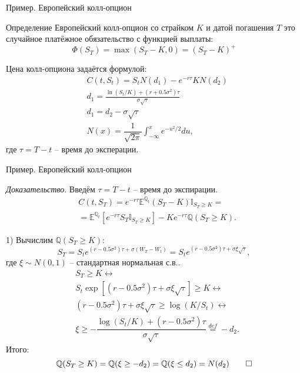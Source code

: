 \documentclass{beamer}
\begin{document}
\begin{frame}{Пример. Европейский колл-опцион}
    \begin{block}{Определение}
        Европейский колл-опцион со страйком $K$ и датой погашения $T$ это случайное платёжное обязательство с функцией выплаты:
        $$\Phi(S_T) = \max(S_T-K, 0) = (S_T - K)^+$$
    \end{block}

    \pause
    Цена колл-опциона задаётся формулой:
    \begin{align*}
        &C(t, S_t) = S_t N(d_1) - e^{-r\tau}K N(d_2) \\
        & d_1 = \frac{\ln(S_t/K) + (r+0.5\sigma^2)\tau}{\sigma \sqrt{\tau}}\\
        &d_1 = d_2 - \sigma \sqrt{\tau}\\
        & N(x) = \dfrac{1}{\sqrt{2\pi}}\int_{-\infty}^x e^{-u^2/2}du,
    \end{align*}где $\tau=T-t$ -- время до эксперации.
\end{frame}

\begin{frame}{Пример. Европейский колл-опцион}
    
    \textit{Доказательство}. Введём $\tau = T - t$ -- время до экспирации.
    \begin{align*}
        &C(t, S_T) = e^{-r\tau}\mathbb{E}^{\mathbb{Q}_t}(S_T - K) \mathbb{I}_{S_T \geq K} = \\
        &= \mathbb{E}^{\mathbb{Q}_t}\left[e^{-r\tau} S_T \mathbb{I}_{S_T \geq K}\right] - K e^{-r\tau} \mathbb{Q}(S_T \geq K).
    \end{align*}

    1) Вычислим $\mathbb{Q}(S_T \geq K)$:
        $$
            S_T = S_t e^{(r-0.5 \sigma^2)\tau + \sigma (W_T - W_t)} = S_t e^{(r-0.5 \sigma^2)\tau + \sigma \xi \sqrt{\tau}},
        $$где $\xi \sim N(0, 1)$ -- стандартная нормальная с.в.. 
        \begin{align*}
            &S_T \geq K \longleftrightarrow \\
            &S_t \exp \left[ (r-0.5\sigma^2)\tau + \sigma \xi \sqrt{\tau}\right] \geq K \longleftrightarrow \\
            &  (r-0.5\sigma^2)\tau + \sigma \xi \sqrt{\tau} \geq \log(K / S_t) \longleftrightarrow \\ 
            & \xi \geq - \dfrac{\log(S_t/K) + (r-0.5\sigma^2)\tau}{\sigma \sqrt{\tau}} \overset{def}{=} -d_2.
        \end{align*}
        Итого:
        $$
            \mathbb{Q}(S_T \geq K) = \mathbb{Q}(\xi \geq -d_2) = \mathbb{Q}(\xi \leq d_2) = N(d_2) \qed
        $$
\end{frame}
\end{document}
